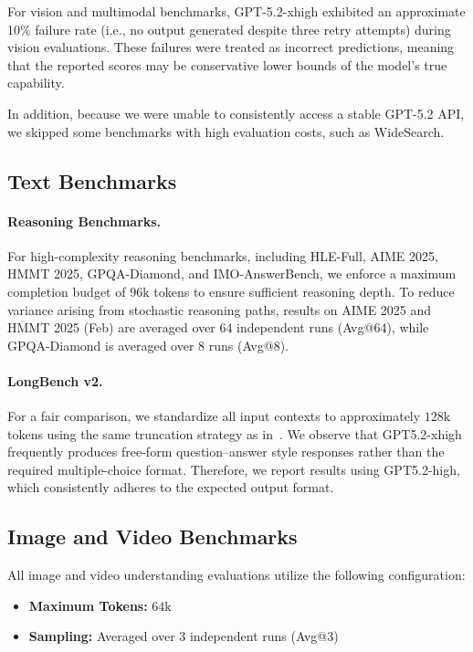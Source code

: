 \documentclass{article}
\begin{document}
For vision and multimodal benchmarks, GPT-5.2-xhigh exhibited an approximate 10\% failure rate (i.e., no output generated despite three retry attempts) during vision evaluations. These failures were treated as incorrect predictions, meaning that the reported scores may be conservative lower bounds of the model’s true capability.

In addition, because we were unable to consistently access a stable GPT-5.2 API, we skipped some benchmarks with high evaluation costs, such as WideSearch.

\subsection{Text Benchmarks}
\label{app:eval_text}

\paragraph{Reasoning Benchmarks.}
For high-complexity reasoning benchmarks, including HLE-Full, AIME 2025, HMMT 2025, GPQA-Diamond, and IMO-AnswerBench, we enforce a maximum completion budget of $96\text{k}$ tokens to ensure sufficient reasoning depth. To reduce variance arising from stochastic reasoning paths, results on AIME 2025 and HMMT 2025 (Feb) are averaged over 64 independent runs (Avg@64), while GPQA-Diamond is averaged over 8 runs (Avg@8).

\paragraph{LongBench v2.}\label{app:eval_longcontext}
For a fair comparison, we standardize all input contexts to approximately $128\text{k}$ tokens using the same truncation strategy as in~\cite{bai2025longbenchv2deeperunderstanding}.
We observe that GPT5.2-xhigh frequently produces free-form question--answer style responses rather than the required multiple-choice format.
Therefore, we report results using GPT5.2-high, which consistently adheres to the expected output format.

\subsection{Image and Video Benchmarks}
\label{app:eval_vision}

All image and video understanding evaluations utilize the following configuration:
\begin{itemize}
    \item \textbf{Maximum Tokens:} $64\text{k}$
    \item \textbf{Sampling:} Averaged over 3 independent runs (Avg@3)
\end{itemize}
\end{document}
